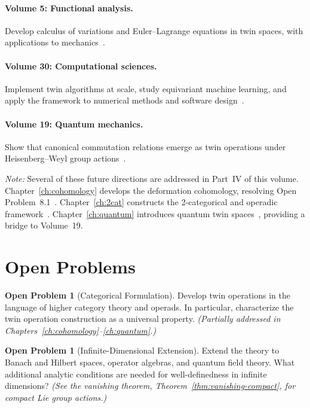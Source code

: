 \documentclass[11pt,a4paper,openany]{book}
\theoremstyle{plain}
\theoremstyle{definition}
\newtheorem{problem}[theorem]{Open Problem}
\begin{document}
\paragraph{Volume 5: Functional analysis.} Develop calculus of variations and Euler--Lagrange equations in twin spaces, with applications to mechanics~\cite{Vol05}.

\paragraph{Volume 30: Computational sciences.} Implement twin algorithms at scale, study equivariant machine learning, and apply the framework to numerical methods and software design~\cite{Vol30}.

\paragraph{Volume 19: Quantum mechanics.} Show that canonical commutation relations emerge as twin operations under Heisenberg--Weyl group actions~\cite{Vol19}.

\medskip
\noindent\textit{Note:} Several of these future directions are addressed in Part~IV of this volume. Chapter~\ref{ch:cohomology} develops the deformation cohomology, resolving Open Problem~8.1~\cite{nembe2025-art71}. Chapter~\ref{ch:2cat} constructs the 2-categorical and operadic framework~\cite{nembe2025-art73}. Chapter~\ref{ch:quantum} introduces quantum twin spaces~\cite{nembe2025-art72}, providing a bridge to Volume~19.

\section{Open Problems}

\begin{problem}[Categorical Formulation]
Develop twin operations in the language of higher category theory and operads. In particular, characterize the twin operation construction as a universal property. \textit{(Partially addressed in Chapters~\ref{ch:cohomology}--\ref{ch:quantum}.)}
\end{problem}

\begin{problem}[Infinite-Dimensional Extension]
Extend the theory to Banach and Hilbert spaces, operator algebras, and quantum field theory. What additional analytic conditions are needed for well-definedness in infinite dimensions? \textit{(See the vanishing theorem, Theorem~\ref{thm:vanishing-compact}, for compact Lie group actions.)}
\end{problem}
\end{document}
